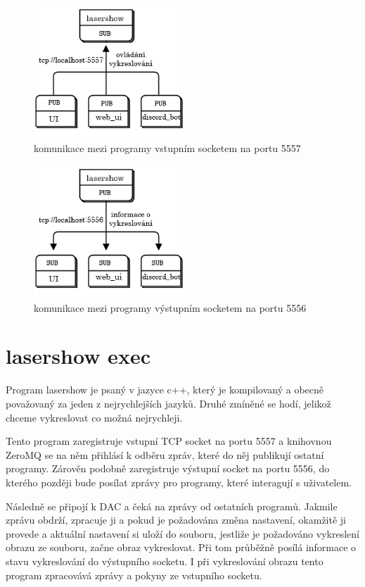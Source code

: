 \documentclass{template/socthesis}
\begin{document}
\begin{figure}[!htb]
  \centering
  \includegraphics[width=0.5\textwidth]{img/tcp5557.png}
  \caption{\label{fig:tcp5557}komunikace mezi programy vstupním socketem na portu 5557}
\end{figure}
\begin{figure}[!htb]
  \centering
  \includegraphics[width=0.5\textwidth]{img/tcp5556.png}
  \caption{\label{fig:tcp5556}komunikace mezi programy výstupním socketem na portu 5556}
\end{figure}

\section{lasershow exec}

Program lasershow je psaný v jazyce c++, který je kompilovaný a obecně považovaný za jeden z nejrychlejších jazyků. Druhé zmíněné se hodí, jelikož chceme vykreslovat co možná nejrychleji.

Tento program zaregistruje vstupní TCP socket na portu 5557 a knihovnou ZeroMQ se na něm přihlásí k odběru zpráv, které do něj publikují ostatní programy. Zárověn podobně zaregistruje výstupní socket na portu 5556, do kterého později bude posílat zprávy pro programy, které interagují s uživatelem.

Následně se připojí k DAC a čeká na zprávy od ostatních programů. Jakmile zprávu obdrží, zpracuje ji a pokud je požadována změna nastavení, okamžitě ji provede a aktuální nastavení si uloží do souboru, jestliže je požadováno vykreslení obrazu ze souboru, začne obraz vykreslovat. Při tom průběžně posílá informace o stavu vykreslování do výstupního socketu. I při vykreslování obrazu tento program zpracovává zprávy a pokyny ze vstupního socketu.
\end{document}
